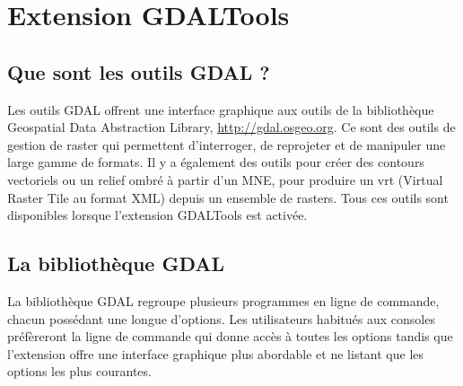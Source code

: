 
\section{Extension GDALTools}\label{label_plugingdaltools}


\subsection{Que sont les outils GDAL ?}\label{whatsgdal}
Les outils GDAL offrent une interface graphique aux outils de la bibliothèque Geospatial Data Abstraction Library, \url{http://gdal.osgeo.org}. Ce sont des outils de gestion de raster qui permettent d'interroger, de reprojeter et de manipuler une large gamme de formats. Il y a également des outils pour créer des contours vectoriels ou un relief ombré à partir d'un MNE, pour produire un vrt (Virtual Raster Tile au format XML) depuis un ensemble de rasters. Tous ces outils sont disponibles lorsque l'extension GDALTools est activée.
\subsection{La bibliothèque GDAL}\label{gdal_lib}
La bibliothèque GDAL regroupe plusieurs programmes en ligne de commande, chacun possédant une longue d'options. Les utilisateurs habitués aux consoles préfèreront la ligne de commande qui donne accès à toutes les options tandis que l'extension offre une interface graphique plus abordable et ne listant que les options les plus courantes.

